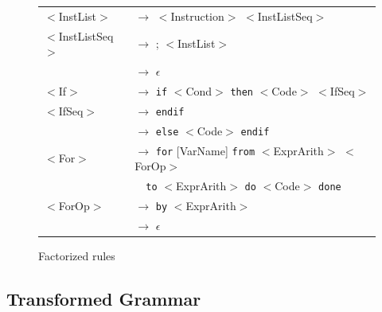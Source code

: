 \documentclass[letterpaper]{article}
\begin{document}
\begin{figure}[H]
    \centering
    \begin{tabular}{l l}
        $<$InstList$>$ & $\rightarrow$ $<$Instruction$>$ $<$InstListSeq$>$\\
        $<$InstListSeq$>$ & $\rightarrow$ ; $<$InstList$>$\\
         & $\rightarrow$ $\epsilon$\\

        $<$If$>$ & $\rightarrow$
        \texttt{if} $<$Cond$>$ \texttt{then} $<$Code$>$ $<$IfSeq$>$\\
        $<$IfSeq$>$ & $\rightarrow$ \texttt{endif}\\
         & $\rightarrow$
         \texttt{else} $<$Code$>$ \texttt{endif}\\

        $<$For$>$ & $\rightarrow$
        \texttt{for} [VarName] \texttt{from}
        $<$ExprArith$>$ $<$ForOp$>$ \\
        &$\quad$\texttt{to}
        $<$ExprArith$>$ \texttt{do} $<$Code$>$ \texttt{done}\\

        $<$ForOp$>$ & $\rightarrow$ \texttt{by} $<$ExprArith$>$\\
         & $\rightarrow$ $\epsilon$\\

    \end{tabular}
    \caption{Factorized rules}
    \label{fig:facto}
\end{figure}

\subsection{Transformed Grammar}
\end{document}
